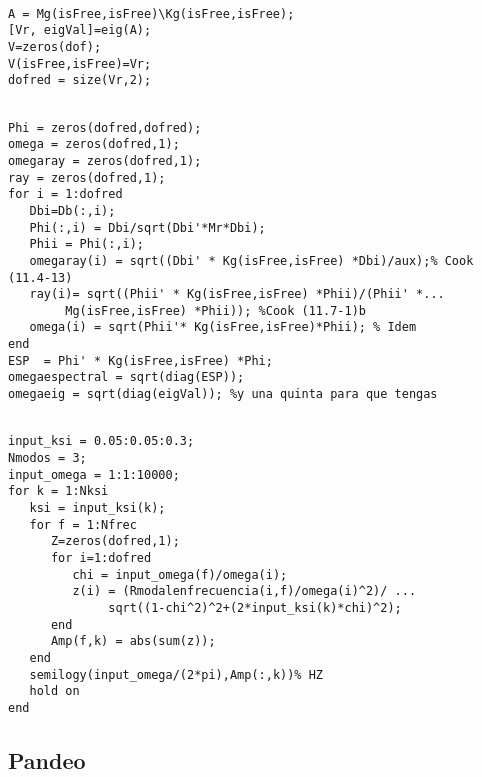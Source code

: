 \begin{code}
	\begin{verbatim}
	
A = Mg(isFree,isFree)\Kg(isFree,isFree);
[Vr, eigVal]=eig(A);
V=zeros(dof);
V(isFree,isFree)=Vr;
dofred = size(Vr,2);
	\end{verbatim}
\end{code}


\begin{code}
	\begin{verbatim}
	
Phi = zeros(dofred,dofred);
omega = zeros(dofred,1);
omegaray = zeros(dofred,1);
ray = zeros(dofred,1);
for i = 1:dofred
   Dbi=Db(:,i);
   Phi(:,i) = Dbi/sqrt(Dbi'*Mr*Dbi);
   Phii = Phi(:,i); 
   omegaray(i) = sqrt((Dbi' * Kg(isFree,isFree) *Dbi)/aux);% Cook (11.4-13)
   ray(i)= sqrt((Phii' * Kg(isFree,isFree) *Phii)/(Phii' *...
        Mg(isFree,isFree) *Phii)); %Cook (11.7-1)b
   omega(i) = sqrt(Phii'* Kg(isFree,isFree)*Phii); % Idem
end
ESP  = Phi' * Kg(isFree,isFree) *Phi;
omegaespectral = sqrt(diag(ESP));
omegaeig = sqrt(diag(eigVal)); %y una quinta para que tengas
	\end{verbatim}
\end{code}

\begin{code}
	\begin{verbatim}
	
input_ksi = 0.05:0.05:0.3;
Nmodos = 3;
input_omega = 1:1:10000;
for k = 1:Nksi
   ksi = input_ksi(k);
   for f = 1:Nfrec
      Z=zeros(dofred,1);
      for i=1:dofred
         chi = input_omega(f)/omega(i);
         z(i) = (Rmodalenfrecuencia(i,f)/omega(i)^2)/ ...
              sqrt((1-chi^2)^2+(2*input_ksi(k)*chi)^2);
      end
      Amp(f,k) = abs(sum(z));
   end
   semilogy(input_omega/(2*pi),Amp(:,k))% HZ
   hold on
end
	\end{verbatim}
\end{code}
\subsection{Pandeo}


